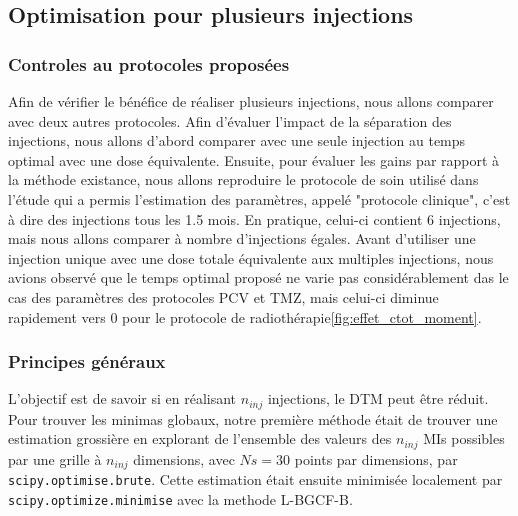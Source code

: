 \documentclass[12pt,a4paper]{article}
\begin{document}
\subsection[Injections répétées]{Optimisation pour plusieurs injections}
\subsubsection[Controles]{Controles au protocoles proposées}
Afin de vérifier le bénéfice de réaliser plusieurs injections, nous allons comparer avec deux autres protocoles. Afin d'évaluer l'impact de la séparation des injections, nous allons d'abord comparer avec une seule injection au temps optimal avec une dose équivalente. Ensuite, pour évaluer les gains par rapport à la méthode existance, nous allons reproduire le protocole de soin utilisé dans l'étude qui a permis l'estimation des paramètres, appelé "protocole clinique", c'est à dire des injections tous les 1.5 mois. En pratique, celui-ci contient 6 injections, mais nous allons comparer à nombre d'injections égales. Avant d'utiliser une injection unique avec une dose totale équivalente aux multiples injections, nous avions observé que le temps optimal proposé ne varie pas considérablement das le cas des paramètres des protocoles PCV et TMZ, mais celui-ci diminue rapidement vers 0 pour le protocole de radiothérapie\ref{fig:effet_ctot_moment}.


\subsubsection{Principes généraux}
L'objectif est de savoir si en réalisant $n_{inj}$ injections, le \ac{DTM} peut être réduit. 
Pour trouver les minimas globaux, notre première méthode était de trouver une estimation grossière en explorant de l'ensemble des valeurs des $n_{inj}$ \acp{MI} possibles par une grille à $n_{inj}$ dimensions, avec $Ns=30$ points par dimensions, par \texttt{scipy.optimise.brute}. Cette estimation était ensuite minimisée localement par \texttt{scipy.optimize.minimise} avec la methode L-BGCF-B\cite{}.\\
\end{document}
